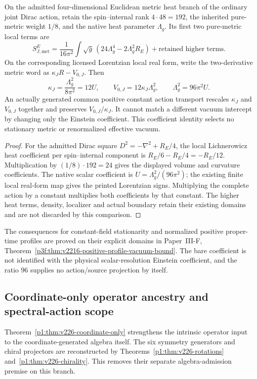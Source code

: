 \documentclass[12pt,a4paper]{article}
\begin{document}
\begin{corollary}
\label{p3b:cor:v2216-bare-vacuum-ratio}
On the admitted four-dimensional Euclidean metric heat branch of the
ordinary joint Dirac action, retain the spin--internal rank
$4\cdot48=192$, the inherited pure-metric weight $1/8$, and the
native heat parameter $\Lambda_g$. Its first two pure-metric local
terms are
\[
 S_{J,\mathrm{met}}^E
 =\frac{1}{16\pi^2}\int\sqrt g\,
       (24\Lambda_g^4-2\Lambda_g^2R_E)
       +\text{retained higher terms}.
\]
On the corresponding licensed Lorentzian local real form, write the
two-derivative metric word as $\kappa_JR-V_{0,J}$. Then
\[
 \kappa_J=\frac{\Lambda_g^2}{8\pi^2}=12U,
 \qquad V_{0,J}=12\kappa_J\Lambda_g^2,
 \qquad \Lambda_g^2=96\pi^2U.
\]
An actually generated common positive constant action transport rescales
$\kappa_J$ and $V_{0,J}$ together and preserves $V_{0,J}/\kappa_J$.
It cannot match a different vacuum intercept by changing only the
Einstein coefficient. This coefficient identity selects no stationary
metric or renormalized effective vacuum.
\end{corollary}
\begin{proof}
For the admitted Dirac square $D^2=-\nabla^2+R_E/4$, the local
Lichnerowicz heat coefficient per spin--internal component is
$R_E/6-R_E/4=-R_E/12$. Multiplication by
$(1/8)\cdot192=24$ gives the displayed volume and curvature
coefficients. The native scalar coefficient is
$U=\Lambda_g^2/(96\pi^2)$; the existing finite local real-form
map gives the printed Lorentzian signs. Multiplying the complete
action by a constant multiplies both coefficients by that constant.
The higher heat terms, density, localizer and actual boundary retain
their existing domains and are not discarded by this comparison.
\end{proof}

The consequences for constant-field stationarity and normalized positive
proper-time profiles are proved on their explicit domains in
Paper~III-F, Theorem~\ref{p3f:thm:v2216-positive-profile-vacuum-bound}.
The bare coefficient is not identified with the physical scalar-resolution
Einstein coefficient, and the ratio $96$ supplies no action/source
projection by itself.


\subsection{Coordinate-only operator ancestry and spectral-action scope}
\label{p3b:sec:v226-spectral-action-ancestry}
Theorem~\ref{p1:thm:v226-coordinate-only} strengthens the intrinsic
operator input to the coordinate-generated algebra itself. The six symmetry
generators and chiral projectors are reconstructed by
Theorems~\ref{p1:thm:v226-rotations} and~\ref{p1:thm:v226-chirality}.
This removes their separate algebra-admission premise on this branch.
\end{document}
